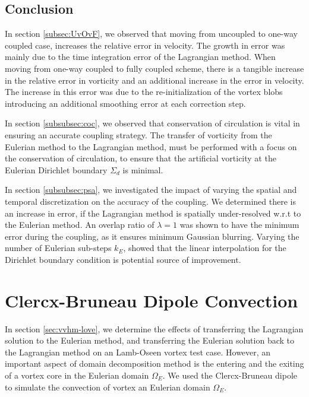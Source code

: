 \subsection{Conclusion}

In section \ref{subsec:UvOvF}, we observed that moving from uncoupled to one-way coupled case, increases the relative error in velocity. The growth in error was mainly due to the time integration error of the Lagrangian method. When moving from one-way coupled to fully coupled scheme, there is a tangible increase in the relative error in vorticity and an additional increase in the error in velocity. The increase in this error was due to the re-initialization of the vortex blobs introducing an additional smoothing error at each correction step.

In section \ref{subsubsec:coc}, we observed that conservation of circulation is vital in ensuring an accurate coupling strategy. The transfer of vorticity from the Eulerian method to the Lagrangian method, must be performed with a focus on the conservation of circulation, to ensure that the artificial vorticity at the Eulerian Dirichlet boundary $\Sigma_d$ is minimal.

In section \ref{subsubsec:psa}, we investigated the impact of varying the spatial and temporal discretization on the accuracy of the coupling. We determined there is an increase in error, if the Lagrangian method is spatially under-resolved w.r.t to the Eulerian method. An overlap ratio of $\lambda=1$ was shown to have the minimum error during the coupling, as it ensures minimum Gaussian blurring. Varying the number of Eulerian sub-steps $k_E$, showed that the linear interpolation for the Dirichlet boundary condition is potential source of improvement.

\section{Clercx-Bruneau Dipole Convection}
\label{sec:vvhm-cbdc}

In section \ref{sec:vvhm-love}, we determine the effects of transferring the Lagrangian solution to the Eulerian method, and transferring the Eulerian solution back to the Lagrangian method on an Lamb-Oseen vortex test case. However, an important aspect of domain decomposition method is the entering and the exiting of a vortex core in the Eulerian domain $\Omega_E$. We used the Clercx-Bruneau dipole \cite{Clercx2006a} to simulate the convection of vortex an Eulerian domain $\Omega_E$. 

